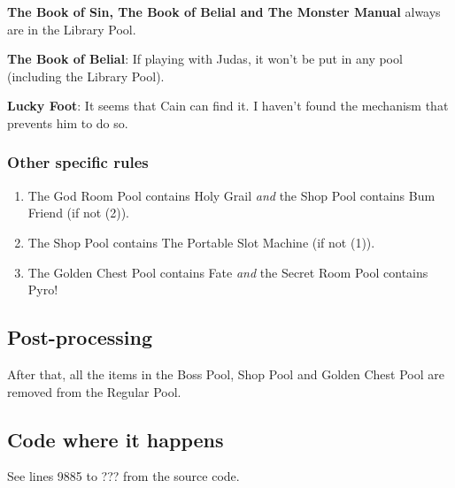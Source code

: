 \noindent \textbf{The Book of Sin, The Book of Belial and The Monster Manual} always are in the Library Pool.

\noindent \textbf{The Book of Belial}: If playing with Judas, it won't be put in any pool (including the Library Pool).

\noindent \textbf{Lucky Foot}: It seems that Cain can find it. I haven't found the mechanism that prevents him to do so.

\subsubsection*{Other specific rules}

\begin{table}[H]
\end{table}

\begin{enumerate}[(1) :]
\item The God Room Pool contains Holy Grail \textit{and} the Shop Pool contains Bum Friend (if not (2)).
\item The Shop Pool contains The Portable Slot Machine (if not (1)).
\item The Golden Chest Pool contains Fate \textit{and} the Secret Room Pool contains Pyro!
\end{enumerate}

\subsection{Post-processing}
After that, all the items in the Boss Pool, Shop Pool and Golden Chest Pool are removed from the Regular Pool.

\subsection{Code where it happens}
See lines 9885 to ??? from the source code.
